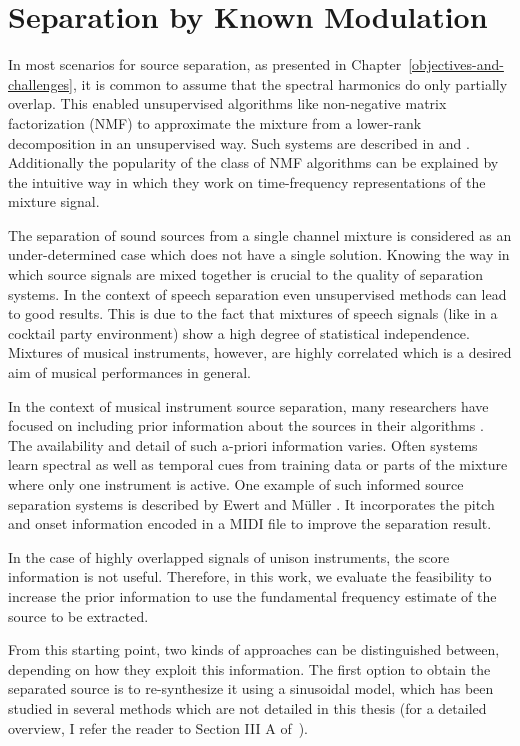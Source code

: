 \chapter{Separation by Known Modulation}

In most scenarios for source separation, as presented in Chapter~\ref{objectives-and-challenges}, it is common to assume that the spectral harmonics do only partially overlap.
This enabled unsupervised algorithms like non-negative matrix factorization (NMF) to approximate the mixture from a lower-rank decomposition in an unsupervised way.
Such systems are described in \cite{smaragdis03} and \cite{virtanen07}.
Additionally the popularity of the class of NMF algorithms can be explained by the intuitive way in which they work on time-frequency representations of the mixture signal.

The separation of sound sources from a single channel mixture is considered as an under-determined case which does not have a single solution. Knowing the way in which source signals are mixed together is crucial to the quality of separation systems. In the context of speech separation even unsupervised methods can lead to good results. This is due to the fact that mixtures of speech signals (like in a cocktail party environment) show a high degree of statistical independence. Mixtures of musical instruments, however, are highly correlated which is a desired aim of musical performances in general.

In the context of musical instrument source separation, many researchers have focused on including prior information about the sources in their algorithms \cite{ozerov12}.
The availability and detail of such a-priori information varies. Often systems learn spectral as well as temporal cues from training data or parts of the mixture where only one instrument is active.
One example of such informed source separation systems is described by Ewert and M\"uller \cite{ewert12}.
It incorporates the pitch and onset information encoded in a MIDI file to improve the separation result.

In the case of highly overlapped signals of unison instruments, the score information is not useful.
Therefore, in this work, we evaluate the feasibility to increase the prior information to use the fundamental frequency estimate of the source to be extracted.

From this starting point, two kinds of approaches can be distinguished between, depending on how they exploit this information.
The first option to obtain the separated source is to re-synthesize it using a sinusoidal model, which has been studied in several methods which are not detailed in this thesis (for a detailed overview, I refer the reader to Section III A of~\cite{rafii}).

